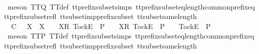 \begin{isabellebody}
\ \ \ \ \ \ \isamarkupfalse%
\ {\isacharparenleft}meson\ TT{}{\isacharunderscore}Q\ TT{}{\isacharunderscore}def\ tt{\isacharunderscore}prefix{\isacharunderscore}subset{\isachardot}simps{\isacharparenleft}{}{\isacharparenright}\ tt{\isacharunderscore}prefix{\isacharunderscore}subset{\isacharunderscore}eq{\isacharunderscore}length{\isacharunderscore}common{\isacharunderscore}prefix{\isacharunderscore}eq\ tt{\isacharunderscore}prefix{\isacharunderscore}subset{\isacharunderscore}refl\ tt{\isacharunderscore}subset{\isacharunderscore}imp{\isacharunderscore}prefix{\isacharunderscore}subset\ tt{\isacharunderscore}subset{\isacharunderscore}same{\isacharunderscore}length{\isacharparenright}\isanewline
\ \ \isamarkupfalse%
\isanewline
\ \ \ \ \isamarkupfalse%
\ {\isachardoublequoteopen}{\isasymrho}{\isacharprime}\ {\isasymsubseteq}\isactrlsub C\ {\isasymrho}{\isacharprime}{\isacharprime}\ {\isasymLongrightarrow}\ X\ {\isasymsubseteq}\ X{\isacharprime}\ {\isasymLongrightarrow}\ {\isasymrho}{\isacharprime}{\isacharprime}\ {\isacharat}\ {\isacharbrackleft}{\isacharbrackleft}X{\isacharprime}{\isacharbrackright}\isactrlsub R{\isacharcomma}\ {\isacharbrackleft}Tock{\isacharbrackright}\isactrlsub E{\isacharbrackright}\ {\isasymin}\ P\ {\isasymLongrightarrow}\ {\isasymrho}{\isacharprime}\ {\isacharat}\ {\isacharbrackleft}{\isacharbrackleft}X{\isacharbrackright}\isactrlsub R{\isacharcomma}\ {\isacharbrackleft}Tock{\isacharbrackright}\isactrlsub E{\isacharbrackright}\ {\isasymnotin}\ P\ {\isasymLongrightarrow}\ {\isasymrho}{\isacharprime}\ {\isacharat}\ {\isacharbrackleft}{\isacharbrackleft}Tock{\isacharbrackright}\isactrlsub E{\isacharbrackright}\ {\isasymin}\ P{\isachardoublequoteclose}\isanewline
\ \ \ \ \ \ \isamarkupfalse%
\ {\isacharparenleft}meson\ TT{}{\isacharunderscore}P\ TT{}{\isacharunderscore}def\ tt{\isacharunderscore}prefix{\isacharunderscore}subset{\isachardot}simps{\isacharparenleft}{}{\isacharparenright}\ tt{\isacharunderscore}prefix{\isacharunderscore}subset{\isacharunderscore}eq{\isacharunderscore}length{\isacharunderscore}common{\isacharunderscore}prefix{\isacharunderscore}eq\ tt{\isacharunderscore}prefix{\isacharunderscore}subset{\isacharunderscore}refl\ tt{\isacharunderscore}subset{\isacharunderscore}imp{\isacharunderscore}prefix{\isacharunderscore}subset\ tt{\isacharunderscore}subset{\isacharunderscore}same{\isacharunderscore}length{\isacharparenright}\isanewline
\ \ \isamarkupfalse%
\isanewline
\ \ \ \ \isamarkupfalse%

\end{isabellebody}
